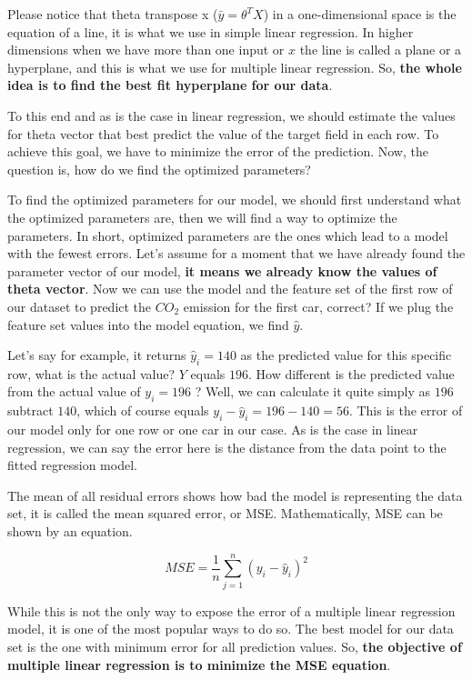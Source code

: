 	Please notice that theta transpose x ($\bar{y} = \theta^{T}X$) in a one-dimensional space is the equation of a line, it is what we use in simple linear regression. In higher dimensions when we have more than one input or $x$ the line is called a plane or a hyperplane, and this is what we use for multiple linear regression. So, \textbf{the whole idea is to find the best fit hyperplane for our data}.
	
	To this end and as is the case in linear regression, we should estimate the values for theta vector that best predict the value of the target field in each row. To achieve this goal, we have to minimize the error of the prediction. Now, the question is, how do we find the optimized parameters? 
	
	To find the optimized parameters for our model, we should first understand what the optimized parameters are, then we will find a way to optimize the parameters. In short, optimized parameters are the ones which lead to a model with the fewest errors. Let's assume for a moment that we have already found the parameter vector of our model, \textbf{it means we already know the values of theta vector}. Now we can use the model and the feature set of the first row of our dataset to predict the $CO_2$ emission for the first car, correct? If we plug the feature set values into the model equation, we find $\hat{y}$. 
	
	Let's say for example, it returns $\hat{y}_{i} = 140$ as the predicted value for this specific row, what is the actual value? $Y$ equals $196$. How different is the predicted value from the actual value of $y_{i} = 196$ ? Well, we can calculate it quite simply as $196$ subtract $140$, which of course equals $y_{i} - \hat{y}_{i} = 196 - 140 = 56$. This is the error of our model only for one row or one car in our case. As is the case in linear regression, we can say the error here is the distance from the data point to the fitted regression model. 
	
	The mean of all residual errors shows how bad the model is representing the data set, it is called the mean squared error, or MSE. Mathematically, MSE can be shown by an equation. 
	
	\begin{equation} 
		MSE = \frac{1}{n} \sum_{j=1}^{n} (y_{i} - \hat{y}_{i})^{2}
	\end{equation}
	
	While this is not the only way to expose the error of a multiple linear regression model, it is one of the most popular ways to do so. The best model for our data set is the one with minimum error for all prediction values. So,\textbf{ the objective of multiple linear regression is to minimize the MSE equation}. 
	
